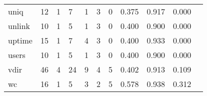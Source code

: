 \begin{longtable}{lp{1.2cm}p{1.2cm}p{1.2cm}p{1.2cm}p{1.2cm}p{1.2cm}p{1.2cm}p{1.2cm}p{1.2cm}p{1.2cm}}
uniq      &                                    12 &                                                  1 &                                                  7 &                                                  1 &                                                  3 &                                                  0 &                                         0.375 &                                              0.917 &                                              0.000 \\
unlink    &                                    10 &                                                  1 &                                                  5 &                                                  1 &                                                  3 &                                                  0 &                                         0.400 &                                              0.900 &                                              0.000 \\
uptime    &                                    15 &                                                  1 &                                                  7 &                                                  4 &                                                  3 &                                                  0 &                                         0.400 &                                              0.933 &                                              0.000 \\
users     &                                    10 &                                                  1 &                                                  5 &                                                  1 &                                                  3 &                                                  0 &                                         0.400 &                                              0.900 &                                              0.000 \\
vdir      &                                    46 &                                                  4 &                                                 24 &                                                  9 &                                                  4 &                                                  5 &                                         0.402 &                                              0.913 &                                              0.109 \\
wc        &                                    16 &                                                  1 &                                                  5 &                                                  3 &                                                  2 &                                                  5 &                                         0.578 &                                              0.938 &                                              0.312 \\

\end{longtable}
